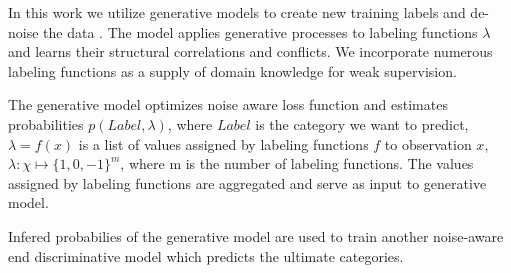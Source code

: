 
In this work we utilize generative models to create new training labels and de-noise the data \cite{Ratner2016}.
The model applies generative processes to labeling functions $\lambda$ and learns their structural correlations and conflicts.
We incorporate numerous labeling functions as a supply of domain knowledge for weak supervision.

The generative model optimizes noise aware loss function and estimates probabilities $p(Label, \lambda)$,
where $Label$ is the category we want to predict, $\lambda = f(x)$ is a list of values assigned by labeling
functions $f$ to observation $x$, $\lambda : \chi \mapsto \{1, 0, -1\}^m$, where m is the number of labeling functions.
The values assigned by labeling functions are aggregated and serve as input to generative model.

Infered probabilies of the generative model are used to train another noise-aware end discriminative model which
predicts the ultimate categories.

